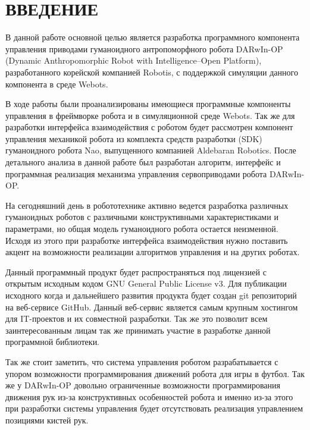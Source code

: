 \chapter*{ВВЕДЕНИЕ}

В данной работе основной целью является разработка программного компонента управления приводами гуманоидного антропоморфного робота DARwIn-OP (Dynamic Anthropomorphic Robot with Intelligence–Open Platform), разработанного корейской компанией  Robotis, с поддержкой симуляции данного компонента в среде Webots.

В ходе работы были проанализированы имеющиеся программные компоненты управления в фреймворке робота и в симуляционной среде Webots. Так же для разработки интерфейса взаимодействия с роботом будет рассмотрен компонент управления механикой робота из комплекта средств разработки (SDK) гуманоидного робота Nao, выпущенного компанией Aldebaran Robotics. После детального анализа в данной работе был разработан алгоритм, интерфейс и программная реализация механизма управления сервоприводами робота DARwIn-OP.

На сегодняшний день в робототехнике активно ведется разработка различных гуманоидных роботов с различными конструктивными характеристиками и параметрами, но общая модель гуманоидного робота остается неизменной. Исходя из этого при разработке интерфейса взаимодействия нужно поставить акцент на возможности реализации алгоритмов управления и на других роботах.

Данный программный продукт будет распространяться под лицензией с открытым исходным кодом GNU General Public License v3. Для публикации исходного когда и дальнейшего развития продукта будет создан git репозиторий на веб-сервисе GitHub. Данный веб-сервис является самым крупным хостингом для IT-проектов и их совместной разработки. Так же это позволит всем заинтересованным лицам так же принимать участие в разработке данной программной библиотеки.

Так же стоит заметить, что система управления роботом разрабатывается с упором возможности программирования движений робота для игры в футбол. Так же у DARwIn-OP довольно ограниченные возможности программирования движения рук из-за конструктивных особенностей робота и именно из-за этого при разработки системы управления будет отсутствовать реализация управлением позициями кистей рук.
